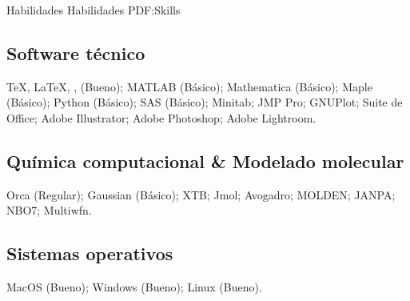 
\Section
{Habilidades}
{Habilidades}
{PDF:Skills}

\Entry
\subsection*{Software técnico}
{\TeX}, {\LaTeX}, {\XeLaTeX}, (Bueno);
MATLAB (Básico);
Mathematica (Básico);
Maple (Básico);
Python (Básico);
SAS (Básico);
Minitab;
JMP Pro;
GNUPlot;
Suite de Office;
Adobe Illustrator;
Adobe Photoshop;
Adobe Lightroom.

\Entry
\subsection*{Química computacional \& Modelado molecular}
Orca (Regular);
Gaussian (Básico);
XTB;
Jmol;
Avogadro;
MOLDEN;
JANPA;
NBO7;
Multiwfn.

\subsection*{Sistemas operativos}
MacOS (Bueno);
Windows (Bueno);
Linux (Bueno).
